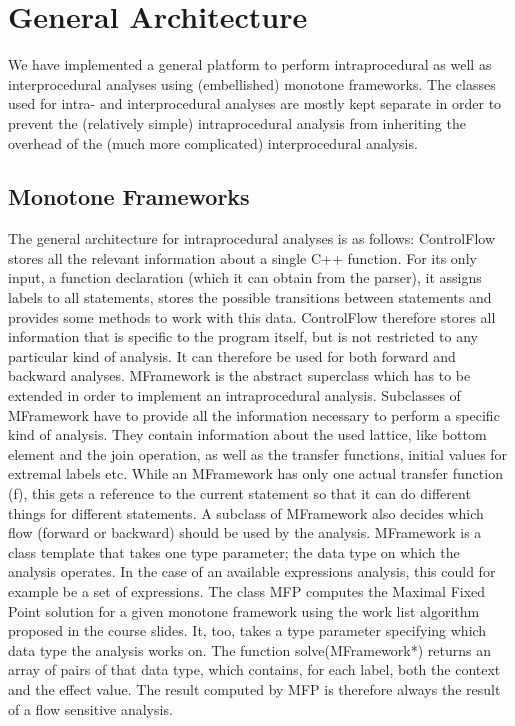 \documentclass[a4paper,11pt]{article}
\begin{document}
\section{General Architecture}
We have implemented a general platform to perform intraprocedural as well as interprocedural analyses using (embellished) monotone frameworks. The classes used for intra- and interprocedural analyses are mostly kept separate in order to prevent the (relatively simple) intraprocedural analysis from inheriting the overhead of the (much more complicated) interprocedural analysis.

\subsection{Monotone Frameworks}
The general architecture for intraprocedural analyses is as follows:
ControlFlow stores all the relevant information about a single C++ function. For its only input, a function declaration (which it can obtain from the parser), it assigns labels to all statements, stores the possible transitions between statements and provides some methods to work with this data. ControlFlow therefore stores all information that is specific to the program itself, but is not restricted to any particular kind of analysis. It can therefore be used for both forward and backward analyses.
MFramework is the abstract superclass which has to be extended in order to implement an intraprocedural analysis. Subclasses of MFramework have to provide all the information necessary to perform a specific kind of analysis. They contain information about the used lattice, like bottom element and the join operation, as well as the transfer functions, initial values for extremal labels etc. While an MFramework has only one actual transfer function (f), this gets a reference to the current statement so that it can do different things for different statements. A subclass of MFramework also decides which flow (forward or backward) should be used by the analysis.
MFramework is a class template that takes one type parameter; the data type on which the analysis operates. In the case of an available expressions analysis, this could for example be a set of expressions.
The class MFP computes the Maximal Fixed Point solution for a given monotone framework using the work list algorithm proposed in the course slides. It, too, takes a type parameter specifying which data type the analysis works on. The function solve(MFramework*) returns an array of pairs of that data type, which contains, for each label, both the context and the effect value. 
The result computed by MFP is therefore always the result of a flow sensitive analysis.
\end{document}
